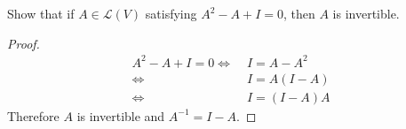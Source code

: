 Show that if $A \in \mathcal{L}(V)$ satisfying $A^2 -A+I=0$, then $A$ is invertible.
\begin{mybox}
\begin{proof}
\begin{align*}
    A^2 -A+I=0
    \iff \;& I = A - A^2\\
    \iff \;& I = A(I-A)\\
    \iff \;& I = (I-A)A
\end{align*}
Therefore $A$ is invertible and $A^{-1} = I-A$.
\end{proof}
\end{mybox}